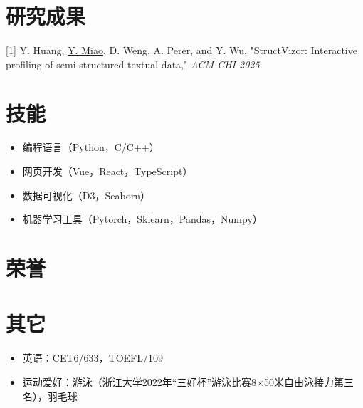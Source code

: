 \documentclass{resume}
\begin{document}
\section{研究成果}
{[1] Y. Huang, \uline{Y. Miao}, D. Weng, A. Perer, and Y. Wu, "StructVizor: Interactive profiling of
semi-structured textual data," \textit{ACM CHI 2025}.}


\section{技能}
\begin{itemize}[parsep=0.5ex]
    \item 编程语言（Python，C/C++）
    \item 网页开发（Vue，React，TypeScript）
    \item 数据可视化（D3，Seaborn）
    \item 机器学习工具（Pytorch，Sklearn，Pandas，Numpy）
\end{itemize}

\section{荣誉}

\section{其它}
\begin{itemize}[parsep=0.5ex]
  \item 英语：CET6/633，TOEFL/109
  \item 运动爱好：游泳（浙江大学2022年“三好杯”游泳比赛8×50米自由泳接力第三名），羽毛球
\end{itemize}

%
%
\end{document}
